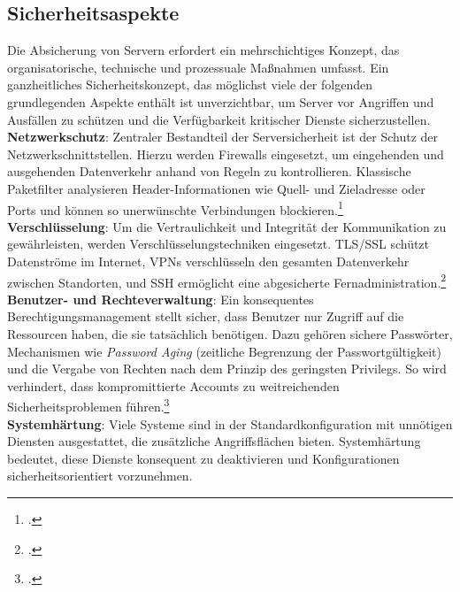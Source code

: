 \documentclass[12pt,a4paper]{report}
\begin{document}
  \subsection{Sicherheitsaspekte}
  Die Absicherung von Servern erfordert ein mehrschichtiges Konzept, 
  das organisatorische, technische und prozessuale Maßnahmen umfasst.
  Ein ganzheitliches Sicherheitskonzept, das möglichst viele der folgenden grundlegenden Aspekte enthält ist unverzichtbar, 
  um Server vor Angriffen und Ausfällen zu schützen und die Verfügbarkeit kritischer Dienste sicherzustellen.
  \\
  \newline
  \textbf{Netzwerkschutz}:  
  Zentraler Bestandteil der Serversicherheit ist der Schutz der Netzwerkschnittstellen. 
  Hierzu werden Firewalls eingesetzt, um eingehenden und ausgehenden Datenverkehr anhand von Regeln zu kontrollieren. 
  Klassische Paketfilter analysieren Header-Informationen wie Quell- und Zieladresse oder Ports und können so unerwünschte Verbindungen blockieren.\footcite[Vgl.][S.~932~ff.]{nemeth_unixlinux}  
  \\
  \newline
  \textbf{Verschlüsselung}:  
  Um die Vertraulichkeit und Integrität der Kommunikation zu gewährleisten, werden Verschlüsselungstechniken eingesetzt. 
  \ac{TLS}/\ac{SSL} schützt Datenströme im Internet, \acp{VPN} verschlüsseln den gesamten Datenverkehr zwischen Standorten, 
  und \ac{SSH} ermöglicht eine abgesicherte Fernadministration.\footcite[Vgl.][S.~801, S.~971, S.~926~ff., S.~942]{nemeth_unixlinux}  
  \\
  \newline
  \textbf{Benutzer- und Rechteverwaltung}:  
  Ein konsequentes Berechtigungsmanagement stellt sicher, dass Benutzer nur Zugriff auf die Ressourcen haben, die sie tatsächlich benötigen. 
  Dazu gehören sichere Passwörter, Mechanismen wie \emph{Password Aging} (zeitliche Begrenzung der Passwortgültigkeit) 
  und die Vergabe von Rechten nach dem Prinzip des geringsten Privilegs. 
  So wird verhindert, dass kompromittierte Accounts zu weitreichenden Sicherheitsproblemen führen.\footcite[Vgl.][S.~905~ff.]{nemeth_unixlinux}  
  \\
  \newline
  \textbf{Systemhärtung}:  
  Viele Systeme sind in der Standardkonfiguration mit unnötigen Diensten ausgestattet, die zusätzliche Angriffsflächen bieten. 
  Systemhärtung bedeutet, diese Dienste konsequent zu deaktivieren und Konfigurationen sicherheitsorientiert vorzunehmen. 
\end{document}
